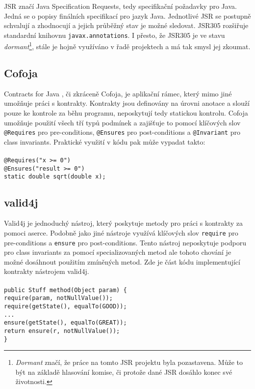 			JSR značí Java Specification Requests, tedy specifikační požadavky pro Java. Jedná se o popisy finálních specifikací pro jazyk Java. Jednotlivé JSR se postupně schvalují a zhodnocují a jejich průběžný stav je možné sledovat. JSR305 rozšiřuje standardní knihovnu \texttt{javax.annotations}. I přesto, že JSR305 je ve stavu \emph{dormant}\footnote{\emph{Dormant} značí, že práce na tomto JSR projektu byla pozastavena. Může to být na základě hlasování komise, či protože dané JSR dosáhlo konec své životnosti.}, stále je hojně využíváno v řadě projektech a má tak smysl jej zkoumat.
			
	
		\subsection{Cofoja}
			Contracts for Java \cite{cofoja}, či zkráceně Cofoja, je aplikační rámec, který mimo jiné umožňuje práci s kontrakty. Kontrakty jsou definovány na úrovni anotace a slouží pouze ke kontrole za běhu programu, neposkytují tedy statickou kontrolu. Cofoja umožňuje použití všech tří typů podmínek a zajišťuje to pomocí klíčových slov \texttt{@Requires} pro pre-conditions, 
\texttt{@Ensures} pro post-conditions a \texttt{@Invariant} pro class invariants. Praktické využití v kódu pak může vypadat takto:\\\\
				\- \- \- \- \- \texttt{@Requires("x >= 0")}\\
				\- \- \- \- \- \texttt{@Ensures("result >= 0")}\\
				\- \- \- \- \- \texttt{static double sqrt(double x);}\\


		\subsection{valid4j}
			Valid4j \cite{valid4j} je jednoduchý nástroj, který poskytuje metody pro práci s kontrakty za pomoci aserce. Podobně jako jiné nástroje využívá klíčových slov \texttt{require} pro pre-conditions a \texttt{ensure} pro post-conditions. Tento nástroj neposkytuje podporu pro class invariants za pomocí specializovaných metod ale tohoto chování je možné dosáhnout použitím zmíněných metod. Zde je část kódu implementující kontrakty nástrojem valid4j.\\\\  
				\- \- \- \- \- \texttt{public Stuff method(Object param) \{}\\
				\- \- \- \- \- \- \- \- \- \- \texttt{require(param, notNullValue());}\\
				\- \- \- \- \- \- \- \- \- \- \texttt{require(getState(), equalTo(GOOD));}\\
				\- \- \- \- \- \- \- \- \- \- \texttt{...}\\
				\- \- \- \- \- \- \- \- \- \- \texttt{ensure(getState(), equalTo(GREAT));}\\
				\- \- \- \- \- \- \- \- \- \- \texttt{return ensure(r, notNullValue());}\\
				\- \- \- \- \- \texttt{\}}\\	
	
